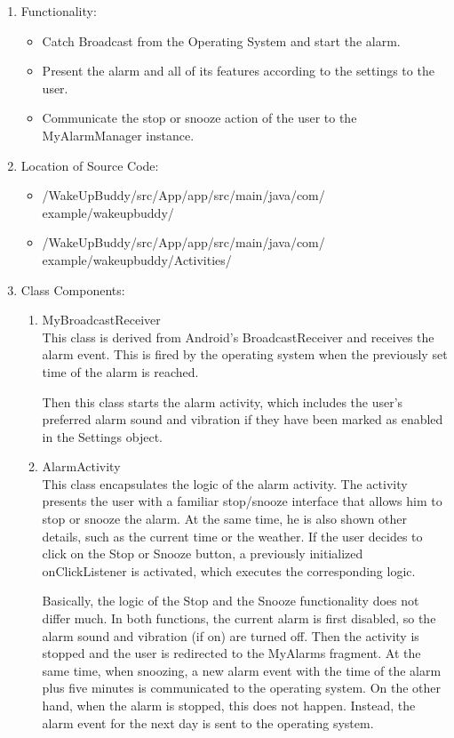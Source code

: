 \documentclass[conference]{IEEEtran}
\begin{document}
\begin{enumerate}
    \item Functionality: 
    \begin{itemize}
        \item Catch Broadcast from the Operating System and start the alarm.
        \item Present the alarm and all of its features according to the settings to the user.
        \item Communicate the stop or snooze action of the user to the MyAlarmManager instance.
    \end{itemize} 
    \item Location of Source Code:
    \begin{itemize}
        \item /WakeUpBuddy/src/App/app/src/main/java/com/
        example/wakeupbuddy/
        \item /WakeUpBuddy/src/App/app/src/main/java/com/
        example/wakeupbuddy/Activities/
    \end{itemize} 
    \item Class Components:
    \begin{enumerate}
        \item MyBroadcastReceiver \\
            This class is derived from Android's BroadcastReceiver and receives the alarm event. This is fired by the operating system when the previously set time of the alarm is reached.
            \par Then this class starts the alarm activity, which includes the user's preferred alarm sound and vibration if they have been marked as enabled in the Settings object. \\
        \item AlarmActivity \\
            This class encapsulates the logic of the alarm activity. The activity presents the user with a familiar stop/snooze interface that allows him to stop or snooze the alarm. At the same time, he is also shown other details, such as the current time or the weather. If the user decides to click on the Stop or Snooze button, a previously initialized onClickListener is activated, which executes the corresponding logic. 
            \par Basically, the logic of the Stop and the Snooze functionality does not differ much. In both functions, the current alarm is first disabled, so the alarm sound and vibration (if on) are turned off. Then the activity is stopped and the user is redirected to the MyAlarms fragment. At the same time, when snoozing, a new alarm event with the time of the alarm plus five minutes is communicated to the operating system. On the other hand, when the alarm is stopped, this does not happen. Instead, the alarm event for the next day is sent to the operating system.\\
        
    \end{enumerate}
\end{enumerate}
\end{document}
